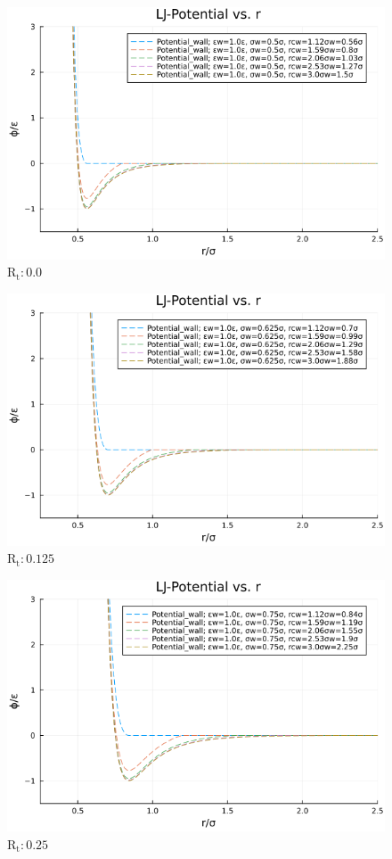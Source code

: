 \begin{figure}[H]
  \centering
  \includegraphics[scale=0.5]{image/RaRtmap_LJ/LJ-Potential_Rt0.0.png}
  \caption{$\text{R}_\text{t}:0.0$}
  \label{}
\end{figure}

\begin{figure}[H]
  \centering
  \includegraphics[scale=0.5]{image/RaRtmap_LJ/LJ-Potential_Rt0.125.png}
  \caption{$\text{R}_\text{t}:0.125$}
  \label{}
\end{figure}

\begin{figure}[H]
  \centering
  \includegraphics[scale=0.5]{image/RaRtmap_LJ/LJ-Potential_Rt0.25.png}
  \caption{$\text{R}_\text{t}:0.25$}
  \label{}
\end{figure}

